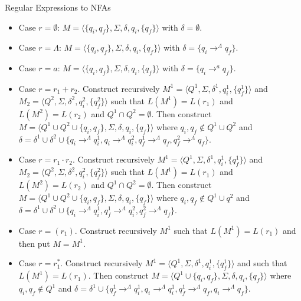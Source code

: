 \documentclass{beamer}
\begin{document}
\begin{frame}[allowframebreaks]{Regular Expressions to NFAs}
\begin{itemize}
  \item Case $r=\emptyset$: $M=\langle \{q_i,q_f\},\Sigma,\delta,q_i,\{q_f\}\rangle$ 
  	with $\delta=\emptyset$.
  \item Case $r=\Lambda$: $M=\langle \{q_i,q_f\},\Sigma,\delta,q_i,\{q_f\}\rangle$ 
  	with $\delta = \{q_i\longrightarrow^\Lambda q_f\}$. 
  \item Case $r=a$: $M=\langle \{q_i,q_f\},\Sigma,\delta,q_i,\{q_f\}\rangle$ 
  	with $\delta = \{q_i\longrightarrow^a q_f\}$. 
  \item Case $r=r_1+r_2$. Construct recursively $M^1=\langle Q^1,\Sigma, \delta^1,q_i^1, \{q_f^1\}\rangle$ and 
         $M_2=\langle Q^2,\Sigma, \delta^2,q_i^2, \{q_f^2\}\rangle$ such that 
         $L(M^1)=L(r_1)$ and $L(M^2)=L(r_2)$ and $Q^1\cap Q^2=\emptyset$. Then 
         construct $M=\langle Q^1\cup Q^2\cup\{q_i,q_f\},\Sigma, \delta,q_i, \{q_f\}\rangle$ 
        where $q_i,q_f\not\in  Q^1\cup Q^2$
        and $\delta=\delta^1\cup\delta^2\cup\{q_i\longrightarrow^\Lambda q_i^1, q_i\longrightarrow^\Lambda q_i^2, 
        q_f^1\longrightarrow^\Lambda q_f, q_f^2\longrightarrow^\Lambda q_f\}$. 
     \item Case $r=r_1\cdot r_2$. Construct recursively $M^1=\langle Q^1,\Sigma, \delta^1,q_i^1, \{q_f^1\}\rangle$ and 
         $M_2=\langle Q^2,\Sigma, \delta^2,q_i^2, \{q_f^2\}\rangle$ such that 
         $L(M^1)=L(r_1)$ and $L(M^2)=L(r_2)$ and $Q^1\cap Q^2=\emptyset$. 
        Then construct $M=\langle Q^1\cup Q^2\cup\{q_i,q_f\},\Sigma, \delta,q_i, \{q_f\}\rangle$ 
        where $q_i,q_f\not\in  Q^1\cup q^2$
        and $\delta=\delta^1\cup\delta^2\cup\{q_i\longrightarrow^\Lambda q_i^1,  
        q_f^1 \longrightarrow^\Lambda q_i^2, q_f^2\longrightarrow^\Lambda q_f\}$.  
     \item Case $r=(r_1)$. Construct recursively $M^1$ such that $L(M^1)=L(r_1)$ and then put $M=M^1$.
     \item Case $r=r_1^*$.  Construct recursively $M^1=\langle Q^1,\Sigma, \delta^1,q_i^1, \{q_f^1\}\rangle$ and 
         such that 
         $L(M^1)=L(r_1)$. Then 
         construct $M=\langle Q^1\cup\{q_i,q_f\},\Sigma, \delta,q_i, \{q_f\}\rangle$ 
        where $q_i,q_f\not\in  Q^1$
        and $\delta=\delta^1\cup\{ q_f^1 \longrightarrow^\Lambda q_i^1, 
        q_i\longrightarrow^\Lambda q_i^1,  
        q_f^1\longrightarrow^\Lambda q_f, q_i \longrightarrow^\Lambda q_f\}$.    
\end{itemize}




\end{frame}
\end{document}
